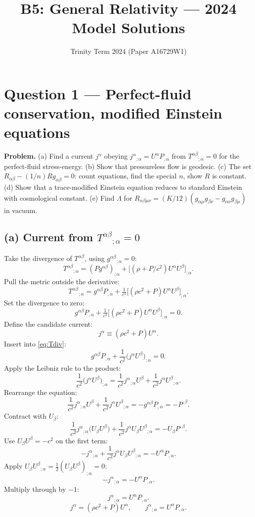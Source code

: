 \documentclass[11pt]{article}
\title{B5: General Relativity --- 2024 Model Solutions}
\author{Trinity Term 2024 (Paper A16729W1)}
\date{}
\begin{document}
\maketitle

\section*{Question 1 --- Perfect-fluid conservation, modified Einstein equations}

\textbf{Problem.} (a) Find a current $j^\alpha$ obeying $j^\alpha{}_{;\alpha}=U^\alpha P_{,\alpha}$ from $T^{\alpha\beta}{}_{;\alpha}=0$ for the perfect-fluid stress-energy. (b) Show that pressureless flow is geodesic. (c) The set $R_{\alpha\beta}-(1/n)Rg_{\alpha\beta}=0$: count equations, find the special $n$, show $R$ is constant. (d) Show that a trace-modified Einstein equation reduces to standard Einstein with cosmological constant. (e) Find $\Lambda$ for $R_{\alpha\beta\mu\nu}=(K/12)(g_{\alpha\mu}g_{\beta\nu}-g_{\alpha\nu}g_{\beta\mu})$ in vacuum.

\subsection*{(a) Current from $T^{\alpha\beta}{}_{;\alpha}=0$}

Take the divergence of $T^{\alpha\beta}$, using $g^{\alpha\beta}{}_{;\alpha}=0$:
\[
T^{\alpha\beta}{}_{;\alpha}=(Pg^{\alpha\beta})_{;\alpha}+\bigl[(\rho+P/c^2)U^\alpha U^\beta\bigr]_{;\alpha}.
\]
Pull the metric outside the derivative:
\[
T^{\alpha\beta}{}_{;\alpha}=g^{\alpha\beta}P_{,\alpha}+\tfrac{1}{c^2}\bigl[(\rho c^2+P)U^\alpha U^\beta\bigr]_{;\alpha}.
\]
Set the divergence to zero:
\begin{equation}
g^{\alpha\beta}P_{,\alpha}+\tfrac{1}{c^2}\bigl[(\rho c^2+P)U^\alpha U^\beta\bigr]_{;\alpha}=0.
\label{eq:Tdiv}
\end{equation}
Define the candidate current:
\[
j^\alpha\equiv (\rho c^2+P)U^\alpha.
\]
Insert into \eqref{eq:Tdiv}:
\[
g^{\alpha\beta}P_{,\alpha}+\frac{1}{c^2}\bigl(j^\alpha U^\beta\bigr)_{;\alpha}=0.
\]
Apply the Leibniz rule to the product:
\[
\frac{1}{c^2}\bigl(j^\alpha U^\beta\bigr)_{;\alpha}=\frac{1}{c^2}j^\alpha{}_{;\alpha}U^\beta+\frac{1}{c^2}j^\alpha U^\beta{}_{;\alpha}.
\]
Rearrange the equation:
\[
\frac{1}{c^2}j^\alpha{}_{;\alpha}U^\beta+\frac{1}{c^2}j^\alpha U^\beta{}_{;\alpha}=-g^{\alpha\beta}P_{,\alpha}=-P^{,\beta}.
\]
Contract with $U_\beta$:
\[
\frac{1}{c^2}j^\alpha{}_{;\alpha}\bigl(U_\beta U^\beta\bigr)+\frac{1}{c^2}j^\alpha U_\beta U^\beta{}_{;\alpha}=-U_\beta P^{,\beta}.
\]
Use $U_\beta U^\beta=-c^2$ on the first term:
\[
-j^\alpha{}_{;\alpha}+\frac{1}{c^2}j^\alpha U_\beta U^\beta{}_{;\alpha}=-U^\alpha P_{,\alpha}.
\]
Apply $U_\beta U^\beta{}_{;\alpha}=\tfrac12(U_\beta U^\beta)_{;\alpha}=0$:
\[
-j^\alpha{}_{;\alpha}=-U^\alpha P_{,\alpha}.
\]
Multiply through by $-1$:
\[
j^\alpha{}_{;\alpha}=U^\alpha P_{,\alpha}.
\]
\begin{equation}
\boxed{\ j^\alpha=(\rho c^2+P)U^\alpha,\qquad j^\alpha{}_{;\alpha}=U^\alpha P_{,\alpha}.\ }
\label{eq:jcurrent}
\end{equation}
\end{document}
